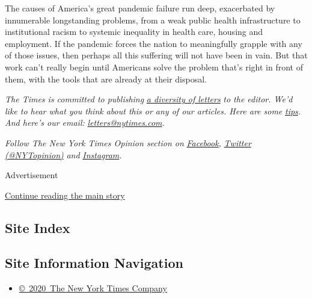 The causes of America's great pandemic failure run deep, exacerbated by
innumerable longstanding problems, from a weak public health
infrastructure to institutional racism to systemic inequality in health
care, housing and employment. If the pandemic forces the nation to
meaningfully grapple with any of those issues, then perhaps all this
suffering will not have been in vain. But that work can't really begin
until Americans solve the problem that's right in front of them, with
the tools that are already at their disposal.

\emph{The Times is committed to publishing}
\href{https://www.nytimes.com/2019/01/31/opinion/letters/letters-to-editor-new-york-times-women.html}{\emph{a
diversity of letters}} \emph{to the editor. We'd like to hear what you
think about this or any of our articles. Here are some}
\href{https://help.nytimes.com/hc/en-us/articles/115014925288-How-to-submit-a-letter-to-the-editor}{\emph{tips}}\emph{.
And here's our email:}
\href{mailto:letters@nytimes.com}{\emph{letters@nytimes.com}}\emph{.}

\emph{Follow The New York Times Opinion section on}
\href{https://www.facebook.com/nytopinion}{\emph{Facebook}}\emph{,}
\href{http://twitter.com/NYTOpinion}{\emph{Twitter (@NYTopinion)}}
\emph{and}
\href{https://www.instagram.com/nytopinion/}{\emph{Instagram}}\emph{.}

Advertisement

\protect\hyperlink{after-bottom}{Continue reading the main story}

\hypertarget{site-index}{%
\subsection{Site Index}\label{site-index}}

\hypertarget{site-information-navigation}{%
\subsection{Site Information
Navigation}\label{site-information-navigation}}

\begin{itemize}
\tightlist
\item
  \href{https://help.nytimes.com/hc/en-us/articles/115014792127-Copyright-notice}{©~2020~The
  New York Times Company}
\end{itemize}

